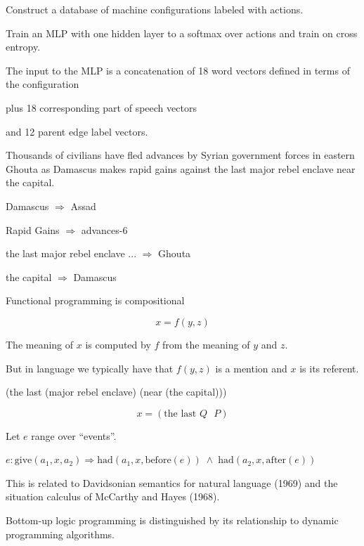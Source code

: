 {

Construct a database of machine configurations labeled with actions.

\vfill
Train an MLP with one hidden layer to a softmax over actions and train on cross entropy.

\vfill
The input to the MLP is a concatenation of 18 word vectors defined in terms of the configuration

\vfill
plus 18 corresponding part of speech vectors

\vfill
and 12 parent edge label vectors.


{\color{blue} Thousands of civilians have fled advances by Syrian government forces in eastern Ghouta as}
Damascus makes rapid gains against the last major rebel enclave near the capital.

\vfill
Damascus $\Rightarrow$ Assad

\vfill
Rapid Gains $\Rightarrow$ advances-6

\vfill
the last major rebel enclave ... $\Rightarrow$ Ghouta

\vfill
the capital $\Rightarrow$ Damascus


Functional programming is compositional

\vfill
$$x = f(y,z)$$

\vfill
The meaning of $x$ is computed by $f$ from the meaning of $y$ and $z$.

\vfill
But in language we typically have that $f(y,z)$ is a mention and $x$ is its referent.

\vfill
(the last (major rebel enclave) (near (the capital)))

\vfill
$$x = (\mbox{the last $Q$ $P$})$$


Let $e$ range over ``events''.

\vfill
$e:\mathrm{give}(a_1,x,a_2) \Rightarrow \mathrm{had}(a_1,x,\mathrm{before}(e)) \;\wedge\; \mathrm{had}(a_2,x,\mathrm{after}(e))$

\vfill
This is related to Davidsonian semantics for natural language (1969) and the situation calculus of McCarthy and Hayes (1968).


Bottom-up logic programming is distinguished by its relationship to dynamic programming algorithms.

}
